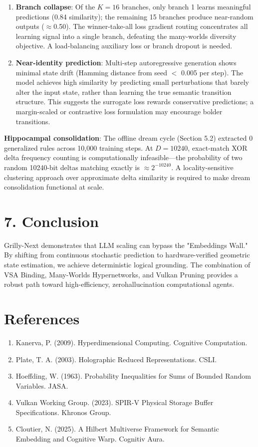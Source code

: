 \documentclass[10pt]{article}
\begin{document}
\begin{enumerate}
\item \textbf{Branch collapse}: Of the $K=16$ branches, only branch 1 learns meaningful predictions (0.84 similarity); the remaining 15 branches produce near-random outputs ($\approx$0.50). The winner-take-all loss gradient routing concentrates all learning signal into a single branch, defeating the many-worlds diversity objective. A load-balancing auxiliary loss or branch dropout is needed.
\item \textbf{Near-identity prediction}: Multi-step autoregressive generation shows minimal state drift (Hamming distance from seed $<$ 0.005 per step). The model achieves high similarity by predicting small perturbations that barely alter the input state, rather than learning the true semantic transition structure. This suggests the surrogate loss rewards conservative predictions; a margin-scaled or contrastive loss formulation may encourage bolder transitions.
\end{enumerate}

\noindent\textbf{Hippocampal consolidation}: The offline dream cycle (Section 5.2) extracted 0 generalized rules across 10,000 training steps. At $D=10240$, exact-match XOR delta frequency counting is computationally infeasible---the probability of two random 10240-bit deltas matching exactly is $\approx 2^{-10240}$. A locality-sensitive clustering approach over approximate delta similarity is required to make dream consolidation functional at scale.

\section*{7. Conclusion}
Grilly-Next demonstrates that LLM scaling can bypass the "Embeddings Wall." By shifting from continuous stochastic prediction to hardware-verified geometric state estimation, we achieve deterministic logical grounding. The combination of VSA Binding, Many-Worlds Hypernetworks, and Vulkan Pruning provides a robust path toward high-efficiency, zerohallucination computational agents.

\section*{References}
\begin{enumerate}
  \item Kanerva, P. (2009). Hyperdimensional Computing. Cognitive Computation.
  \item Plate, T. A. (2003). Holographic Reduced Representations. CSLI.
  \item Hoeffding, W. (1963). Probability Inequalities for Sums of Bounded Random Variables. JASA.
  \item Vulkan Working Group. (2023). SPIR-V Physical Storage Buffer Specifications. Khronos Group.
  \item Cloutier, N. (2025). A Hilbert Multiverse Framework for Semantic Embedding and Cognitive Warp. Cognitiv Aura.
\end{enumerate}
\end{document}
